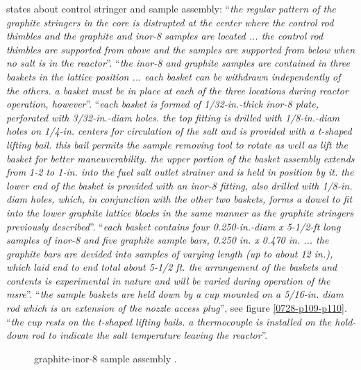 \documentclass{article}
\begin{document}
\begin{preview}
\parencite[page 81 and 84]{ornl-tm-0728} states about control stringer and sample assembly:
\enquote{\textit{the regular pattern of the graphite stringers in the core is distrupted at the center where the control rod thimbles and the graphite and inor-8 samples are located ... the control rod thimbles are supported from above and the samples are supported from below when no salt is in the reactor}}.
\enquote{\textit{the inor-8 and graphite samples are contained in three baskets in the lattice position ... each basket can be withdrawn independently of the others. a basket must be in place at each of the three locations during reactor operation, however}}.
\enquote{\textit{each basket is formed of 1/32-in.-thick inor-8 plate, perforated with 3/32-in.-diam holes. the top fitting is drilled with 1/8-in.-diam holes on 1/4-in. centers for circulation of the salt and is provided with a t-shaped lifting bail. this bail permits the sample removing tool to rotate as well as lift the basket for better maneuverability. the upper portion of the basket assembly extends from 1-2 to 1-in. into the fuel salt outlet strainer and is held in position by it. the lower end of the basket is provided with an inor-8 fitting, also drilled with 1/8-in. diam holes, which, in conjunction with the other two baskets, forms a dowel to fit into the lower graphite lattice blocks in the same manner as the graphite stringers previously described}}.
\enquote{\textit{each basket contains four 0.250-in.-diam x 5-1/2-ft long samples of inor-8 and five graphite sample bars, 0.250 in. x 0.470 in. ... the graphite bars are devided into samples of varying length (up to about 12 in.), which laid end to end total about 5-1/2 ft. the arrangement of the baskets and contents is experimental in nature and will be varied during operation of the msre}}.
\enquote{\textit{the sample baskets are held down by a cup mounted on a 5/16-in. diam rod which is an extension of the nozzle access plug}}, see figure \ref{0728-p109-p110}.
\enquote{\textit{the cup rests on the t-shaped lifting bails. a thermocouple is installed on the hold-down rod to indicate the salt temperature leaving the reactor}}.


\begin{figure}[H]
  \centering
  \caption{graphite-inor-8 sample assembly \parencite[figure 5.8]{tm-0728}.}
  \label{0728-fig5-8}
\end{figure}


\end{preview}
\end{document}
